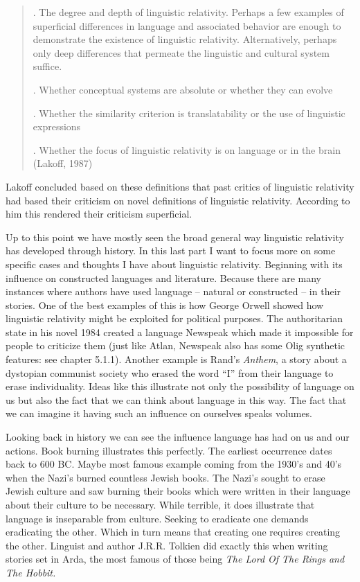\begin{quote}
\begin{singlespace}

. The degree and depth of linguistic relativity. Perhaps a few examples of superficial differences in language and associated behavior are enough to demonstrate the existence of linguistic relativity. Alternatively, perhaps only deep differences that permeate the linguistic and cultural system suffice. 

    . Whether conceptual systems are absolute or whether they can evolve 

    . Whether the similarity criterion is translatability or the use of linguistic expressions 

    . Whether the focus of linguistic relativity is on language or in the brain (Lakoff, 1987)

\end{singlespace}
\end{quote}

\noindent Lakoff concluded based on these definitions that past critics of linguistic relativity had based their criticism on novel definitions of linguistic relativity. According to him this rendered their criticism superficial. 

 
	Up to this point we have mostly seen the broad general way linguistic relativity has developed through history. In this last part I want to focus more on some specific cases and thoughts I have about linguistic relativity. Beginning with its influence on constructed languages and literature. Because there are many instances where authors have used language – natural or constructed – in their stories. One of the best examples of this is how George Orwell showed how linguistic relativity might be exploited for political purposes. The authoritarian state in his novel 1984 created a language Newspeak which made it impossible for people to criticize them (just like Atlan, Newspeak also has some Olig synthetic features: see chapter 5.1.1). Another example is Rand’s \textit{Anthem}, a story about a dystopian communist society who erased the word “I” from their language to erase individuality. Ideas like this illustrate not only the possibility of language on us but also the fact that we can think about language in this way. The fact that we can imagine it having such an influence on ourselves speaks volumes. 

  
	Looking back in history we can see the influence language has had on us and our actions. Book burning illustrates this perfectly. The earliest occurrence dates back to 600 BC. Maybe most famous example coming from the 1930’s and 40’s when the Nazi’s burned countless Jewish books. The Nazi’s sought to erase Jewish culture and saw burning their books which were written in their language about their culture to be necessary. While terrible, it does illustrate that language is inseparable from culture. Seeking to eradicate one demands eradicating the other. Which in turn means that creating one requires creating the other. Linguist and author J.R.R. Tolkien did exactly this when writing stories set in Arda, the most famous of those being \textit{The Lord Of The Rings and The Hobbit.} 


